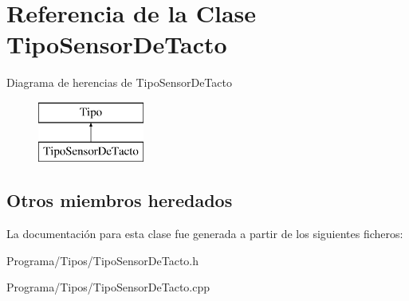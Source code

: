 \hypertarget{class_tipo_sensor_de_tacto}{\section{Referencia de la Clase Tipo\-Sensor\-De\-Tacto}
\label{class_tipo_sensor_de_tacto}
}
Diagrama de herencias de Tipo\-Sensor\-De\-Tacto\begin{figure}[H]
\begin{center}
\leavevmode
\includegraphics[height=2.000000cm]{class_tipo_sensor_de_tacto}
\end{center}
\end{figure}
\subsection*{Otros miembros heredados}


La documentación para esta clase fue generada a partir de los siguientes ficheros\-:\begin{DoxyCompactItemize}
\item 
Programa/\-Tipos/Tipo\-Sensor\-De\-Tacto.\-h\item 
Programa/\-Tipos/Tipo\-Sensor\-De\-Tacto.\-cpp\end{DoxyCompactItemize}
